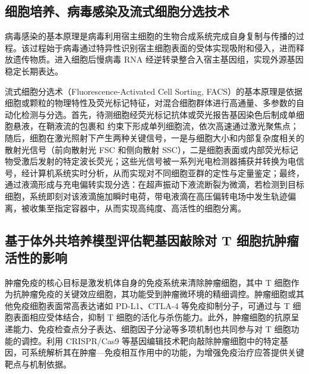 \subsection{细胞培养、病毒感染及流式细胞分选技术}
病毒感染的基本原理是病毒利用宿主细胞的生物合成系统完成自身复制与传播的过程。该过程始于病毒通过特异性识别宿主细胞表面的受体实现吸附和侵入，进而释放遗传物质。进入细胞后慢病毒 RNA 经逆转录整合入宿主基因组，实现外源基因稳定长期表达。

流式细胞分选术（Fluorescence-Activated Cell Sorting, FACS）的基本原理是依据细胞或颗粒的物理特性及荧光标记特征，对混合细胞群体进行高通量、多参数的自动化检测与分选。首先，待测细胞经荧光标记抗体或荧光报告基因染色后制成单细胞悬液，在鞘液流的包裹和
约束下形成单列细胞流，依次高速通过激光聚焦点；随后，细胞在激光照射下产生两种关键信号，一是与细胞大小和内部复杂度相关的散射光信号（前向散射光 FSC 和侧向散射 SSC），二是细胞表面或内部荧光标记物受激后发射的特定波长荧光；这些光信号被一系列光电检测器捕获并转换为电信号，经计算机系统实时分析，从而实现对不同细胞亚群的定性与定量鉴定；最终，通过液滴形成与充电偏转实现分选：在超声振动下液流断裂为微滴，若检测到目标细胞，系统即刻对该液滴施加瞬时电荷，带电液滴在高压偏转电场中发生轨迹偏离，被收集至指定容器中，从而实现高纯度、高活性的细胞分离。

\subsection{基于体外共培养模型评估靶基因敲除对 T 细胞抗肿瘤活性的影响}
肿瘤免疫的核心目标是激发机体自身的免疫系统来清除肿瘤细胞，其中 T 细胞作为抗肿瘤免疫的关键效应细胞，其功能受到肿瘤微环境的精细调控。肿瘤细胞或其他免疫细胞表面常高表达诸如 PD-L1、CTLA-4 等免疫抑制分子，可通过与 T 细胞表面相应受体结合，抑制 T 细胞的活化与杀伤能力。此外，肿瘤细胞的抗原呈递能力、免疫检查点分子表达、细胞因子分泌等多项机制也共同参与对 T 细胞功能的调控。利用 CRISPR/Cas9 等基因编辑技术靶向敲除肿瘤细胞中的特定基因，可系统解析其在肿瘤—免疫相互作用中的功能，为增强免疫治疗应答提供关键靶点与机制依据。